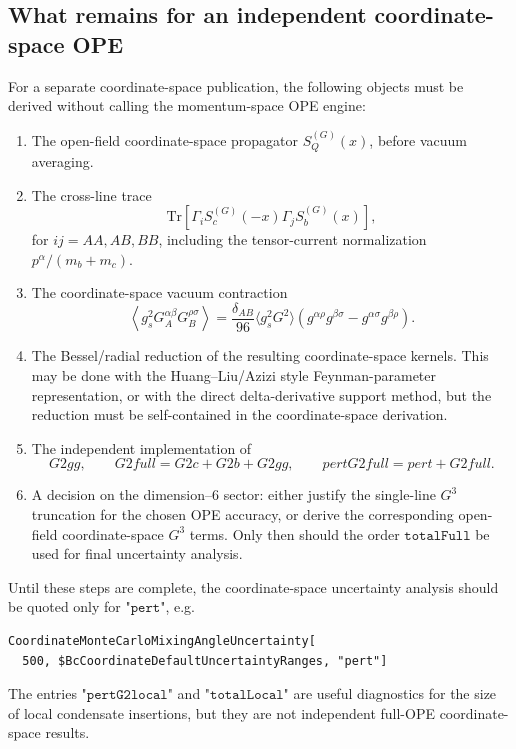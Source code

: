 \documentclass[11pt]{article}
\begin{document}
\subsection{What remains for an independent coordinate-space OPE}

For a separate coordinate-space publication, the following objects must be
derived without calling the momentum-space OPE engine:
\begin{enumerate}
  \item The open-field coordinate-space propagator \(S_Q^{(G)}(x)\), before
  vacuum averaging.
  \item The cross-line trace
  \[
    \mathrm{Tr}\!\left[
      \Gamma_i S_c^{(G)}(-x)\Gamma_j S_b^{(G)}(x)
    \right],
  \]
  for \(ij=AA,AB,BB\), including the tensor-current normalization
  \(p^\alpha/(m_b+m_c)\).
  \item The coordinate-space vacuum contraction
  \[
    \left\langle
      g_s^2G_A^{\alpha\beta}G_B^{\rho\sigma}
    \right\rangle
    =
    \frac{\delta_{AB}}{96}
    \langle g_s^2G^2\rangle
    \left(
      g^{\alpha\rho}g^{\beta\sigma}
      -
      g^{\alpha\sigma}g^{\beta\rho}
    \right).
  \]
  \item The Bessel/radial reduction of the resulting coordinate-space
  kernels.  This may be done with the Huang--Liu/Azizi style Feynman-parameter
  representation, or with the direct delta-derivative support method, but the
  reduction must be self-contained in the coordinate-space derivation.
  \item The independent implementation of
  \[
    G2gg,\qquad
    G2full=G2c+G2b+G2gg,\qquad
    pertG2full=pert+G2full.
  \]
  \item A decision on the dimension--6 sector: either justify the
  single-line \(G^3\) truncation for the chosen OPE accuracy, or derive the
  corresponding open-field coordinate-space \(G^3\) terms.  Only then should
  the order \(\texttt{totalFull}\) be used for final uncertainty analysis.
\end{enumerate}

Until these steps are complete, the coordinate-space uncertainty analysis
should be quoted only for \(\texttt{"pert"}\), e.g.
\begin{verbatim}
CoordinateMonteCarloMixingAngleUncertainty[
  500, $BcCoordinateDefaultUncertaintyRanges, "pert"]
\end{verbatim}
The entries \(\texttt{"pertG2local"}\) and \(\texttt{"totalLocal"}\) are useful
diagnostics for the size of local condensate insertions, but they are not
independent full-OPE coordinate-space results.
\end{document}

